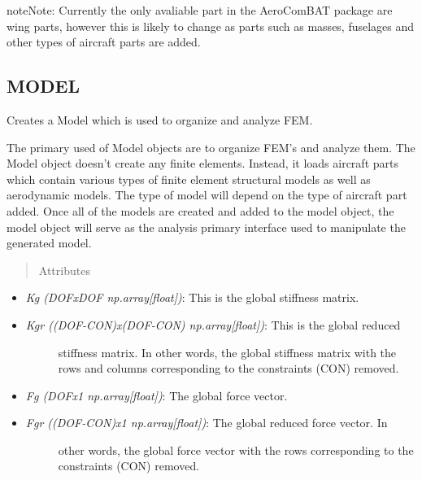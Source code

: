 \documentclass[letterpaper,10pt,english]{sphinxmanual}
\begin{document}
\begin{notice}{note}{Note:}
Currently the only avaliable part in the AeroComBAT package are wing
parts, however this is likely to change as parts such as masses, fuselages
and other types of aircraft parts are added.
\end{notice}


\subsection{MODEL}
\label{FEM:model}

\begin{fulllineitems}
\label{FEM:AeroComBAT.FEM.Model}
Creates a Model which is used to organize and analyze FEM.

The primary used of Model objects are to organize FEM's and analyze them.
The Model object doesn't create any finite elements. Instead, it loads
aircraft parts which contain various types of finite element structural
models as well as aerodynamic models. The type of model will depend on the
type of aircraft part added. Once all of the models are created and added
to the model object, the model object will serve as the analysis primary
interface used to manipulate the generated model.
\begin{quote}\begin{description}
\item[{Attributes}] \leavevmode
\end{description}\end{quote}
\begin{itemize}
\item {} 
\emph{Kg (DOFxDOF np.array{[}float{]})}: This is the global stiffness matrix.

\item {} \begin{description}
\item[{\emph{Kgr ((DOF-CON)x(DOF-CON) np.array{[}float{]})}: This is the global reduced}] \leavevmode
stiffness matrix. In other words, the global stiffness matrix with the
rows and columns corresponding to the constraints (CON) removed.

\end{description}

\item {} 
\emph{Fg (DOFx1 np.array{[}float{]})}: The global force vector.

\item {} \begin{description}
\item[{\emph{Fgr ((DOF-CON)x1 np.array{[}float{]})}: The global reduced force vector. In}] \leavevmode
other words, the global force vector with the rows corresponding to the
constraints (CON) removed.


\end{description}
\end{itemize}
\end{fulllineitems}
\end{document}
